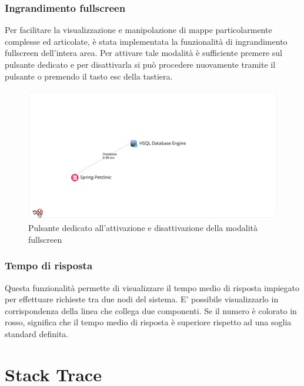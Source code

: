 \subsubsection{Ingrandimento fullscreen}
\label{sec:zoom}
Per facilitare la visualizzazione e manipolazione di mappe particolarmente complesse ed articolate, è stata implementata la funzionalità di ingrandimento fullscreen dell'intera area. Per attivare tale modalità è sufficiente premere sul pulsante dedicato e per disattivarla si può procedere nuovamente tramite il pulsante o premendo il tasto esc della tastiera.
\begin{figure}[H]
	\centering 
	\includegraphics[width=1\textwidth]{Images/fullscreen}
	\caption{Pulsante dedicato all'attivazione e disattivazione della modalità fullscreen}
\end{figure}


\subsubsection{Tempo di risposta}
Questa funzionalità permette di visualizzare il tempo medio di risposta impiegato per effettuare richieste tra due nodi del sistema.
E' possibile visualizzarlo in corrispondenza della linea che collega due componenti.
Se il numero è colorato in rosso, significa che il tempo medio di risposta è superiore rispetto ad una soglia standard definita.

\section{Stack Trace}
\label{sec:strace}

